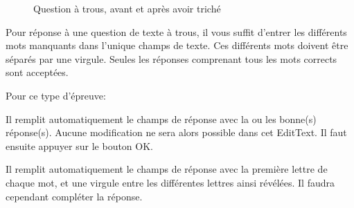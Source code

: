 \documentclass[11pt]{scrreprt}
\begin{document}
\begin{figure}[H]
{        }
        \caption{Question à trous, avant et après avoir triché}
    \end{figure}
    Pour réponse à une question de texte à trous, il vous suffit d'entrer les différents mots manquants dans l'unique champs de texte. Ces différents mots doivent être séparés par une virgule. Seules les réponses comprenant tous les mots corrects sont acceptées.

    Pour ce type d'épreuve:
    \begin{description}[style=nextline]
        \item[Bouton de triche]Il remplit automatiquement le champs de réponse avec la ou les bonne(s) réponse(s). Aucune modification ne sera alors possible dans cet EditText. Il faut ensuite appuyer sur le bouton OK.
        \item[Bouton d'aide]Il remplit automatiquement le champs de réponse avec la première lettre de chaque mot, et une virgule entre les différentes lettres ainsi révélées. Il faudra cependant compléter la réponse.
    \end{description}
\end{document}
